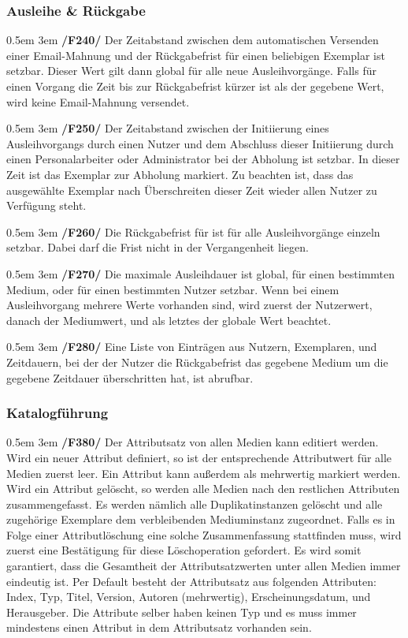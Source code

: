 \documentclass{article}
\newcommand{\specification}[3]{
	{\parindent 0.5em \hangindent 3em \hypertarget{spec:#1:#2}{\textbf{/#1#2/}} #3 \par \nobreak \vspace*{0.5em}}
}
\begin{document}
	\subsubsection{Ausleihe \& Rückgabe}
		\specification{F}{240}{Der Zeitabstand zwischen dem automatischen Versenden einer Email-Mahnung und der Rückgabefrist für einen beliebigen Exemplar ist setzbar.
			Dieser Wert gilt dann global für alle neue Ausleihvorgänge. Falls für einen Vorgang die Zeit bis zur Rückgabefrist kürzer ist als der gegebene Wert, wird keine Email-Mahnung versendet. }
		\specification{F}{250}{Der Zeitabstand zwischen der Initiierung eines Ausleihvorgangs durch einen Nutzer und dem Abschluss dieser Initiierung durch einen Personalarbeiter oder Administrator bei der Abholung ist setzbar.
			In dieser Zeit ist das Exemplar zur Abholung markiert. Zu beachten ist, dass das ausgewählte Exemplar nach Überschreiten dieser Zeit wieder allen Nutzer zu Verfügung steht. }
		\specification{F}{260}{Die Rückgabefrist für ist für alle Ausleihvorgänge einzeln setzbar. Dabei darf die Frist nicht in der Vergangenheit liegen. }
		\specification{F}{270}{Die maximale Ausleihdauer ist global, für einen bestimmten Medium, oder für einen bestimmten Nutzer setzbar.
			Wenn bei einem Ausleihvorgang mehrere Werte vorhanden sind, wird zuerst der Nutzerwert, danach der Mediumwert, und als letztes der globale Wert beachtet. }
		\specification{F}{280}{Eine Liste von Einträgen aus Nutzern, Exemplaren, und Zeitdauern, bei der der Nutzer die Rückgabefrist das gegebene Medium um die gegebene Zeitdauer überschritten hat, ist abrufbar. }
	\subsubsection{Katalogführung}
		\specification{F}{380}{Der Attributsatz von allen Medien kann editiert werden. Wird ein neuer Attribut definiert, so ist der entsprechende Attributwert für alle Medien zuerst leer. Ein Attribut kann außerdem als mehrwertig markiert werden.
			Wird ein Attribut gelöscht, so werden alle Medien nach den restlichen Attributen zusammengefasst. Es werden nämlich alle Duplikatinstanzen gelöscht und alle zugehörige Exemplare dem verbleibenden Mediuminstanz zugeordnet. 
			Falls es in Folge einer Attributlöschung eine solche Zusammenfassung stattfinden muss, wird zuerst eine Bestätigung für diese Löschoperation gefordert. 
			Es wird somit garantiert, dass die Gesamtheit der Attributsatzwerten unter allen Medien immer eindeutig ist. 
			Per Default besteht der Attributsatz aus folgenden Attributen: Index, Typ, Titel, Version, Autoren (mehrwertig), Erscheinungsdatum, und Herausgeber. 
			Die Attribute selber haben keinen Typ und es muss immer mindestens einen Attribut in dem Attributsatz vorhanden sein. }
\end{document}
